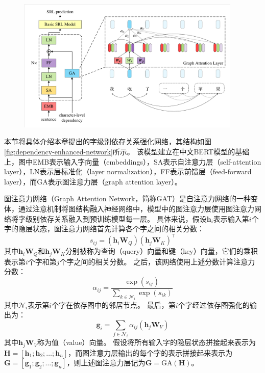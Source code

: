 \begin{figure}[hbtp]
	\centering
	\includegraphics[width=0.95\textwidth]{figures/dependency-enhanced-network.pdf}
\end{figure}

本节将具体介绍本章提出的字级别依存关系强化网络，其结构如图\ref{fig:dependency-enhanced-network}所示。
该模型建立在中文BERT模型的基础上，图中EMB表示输入字向量（embeddings），SA表示自注意力层（self-attention layer），LN表示层标准化（layer normalization），FF表示前馈层（feed-forward layer），而GA表示图注意力层（graph attention layer）。

图注意力网络\cite{velickovic-etal-2018-gat}（Graph Attention Network，简称GAT）是自注意力网络的一种变体，通过注意机制将图结构融入神经网络中，模型中的图注意力层使用图注意力网络将字级别依存关系融入到预训练模型每一层。
具体来说，假设$\bm{h}_i$表示输入第$i$个字的隐层状态，图注意力网络首先计算各个字之间的相关分数：
\begin{equation}
    \label{eq:inter-score}
    s_{ij} = (\bm{h}_i\bm{W}_Q)(\bm{h}_j\bm{W}_K)^{\top}
\end{equation}
其中$\bm{h}_i\bm{W}_Q$和$\bm{h}_j\bm{W}_K$分别被称为查询（query）向量和键（key）向量，它们的乘积表示第$i$个字和第$j$个字之间的相关分数。
之后，该网络使用上述分数计算注意力分数：
\begin{equation}
\label{eq:att-score}
	\alpha_{ij} =\frac{\exp(s_{ij})}{\sum_{k\in\mathcal{N}_i}\exp(s_{ik})}
\end{equation}
其中$\mathcal{N}_i$表示第$i$个字在依存图中的邻居节点。
最后，第$i$个字经过依存图强化的输出为：
\begin{equation}
    \label{eq:gat-output}
	\bm{g}_i =\sum_{j\in \mathcal{N}_i}\alpha_{ij}(\bm{h}_j\bm{W}_V)
\end{equation}
其中$\bm{h}_j\bm{W}_V$称为值（value）向量。
假设将所有输入字的隐层状态拼接起来表示为$\bm{H} = [\bm{h}_1;\bm{h}_2; \dots; \bm{h}_n]$，而图注意力层输出的每个字的表示拼接起来表示为$\bm{G} = [\bm{g}_1;\bm{g}_2; \dots; \bm{g}_n]$，则上述图注意力层记为$\bm{G} = \text{GA}(\bm{H})$。

